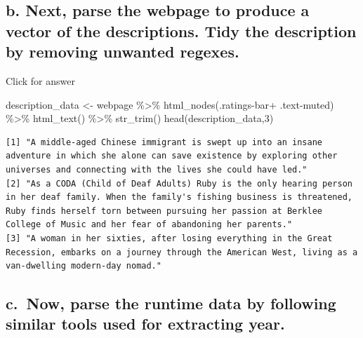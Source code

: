 \documentclass[
]{book}
\newenvironment{Shaded}{\begin{snugshade}}{\end{snugshade}}
\newcommand{\DecValTok}[1]{\textcolor[rgb]{0.00,0.00,0.81}{#1}}
\newcommand{\FunctionTok}[1]{\textcolor[rgb]{0.00,0.00,0.00}{#1}}
\newcommand{\NormalTok}[1]{#1}
\newcommand{\OtherTok}[1]{\textcolor[rgb]{0.56,0.35,0.01}{#1}}
\newcommand{\SpecialCharTok}[1]{\textcolor[rgb]{0.00,0.00,0.00}{#1}}
\newcommand{\StringTok}[1]{\textcolor[rgb]{0.31,0.60,0.02}{#1}}
\begin{document}
\hypertarget{b.-next-parse-the-webpage-to-produce-a-vector-of-the-descriptions.-tidy-the-description-by-removing-unwanted-regexes.}{%
\subsection{b. Next, parse the webpage to produce a vector of the descriptions. Tidy the description by removing unwanted regexes.}\label{b.-next-parse-the-webpage-to-produce-a-vector-of-the-descriptions.-tidy-the-description-by-removing-unwanted-regexes.}}

Click for answer

\begin{Shaded}
\begin{Highlighting}[]
\NormalTok{description\_data }\OtherTok{\textless{}{-}}\NormalTok{ webpage }\SpecialCharTok{\%\textgreater{}\%} 
  \FunctionTok{html\_nodes}\NormalTok{(}\StringTok{\textquotesingle{}.ratings{-}bar+ .text{-}muted\textquotesingle{}}\NormalTok{) }\SpecialCharTok{\%\textgreater{}\%} 
  \FunctionTok{html\_text}\NormalTok{() }\SpecialCharTok{\%\textgreater{}\%} 
  \FunctionTok{str\_trim}\NormalTok{()}
\FunctionTok{head}\NormalTok{(description\_data,}\DecValTok{3}\NormalTok{)}
\end{Highlighting}
\end{Shaded}

\begin{verbatim}
[1] "A middle-aged Chinese immigrant is swept up into an insane adventure in which she alone can save existence by exploring other universes and connecting with the lives she could have led."                                                                      
[2] "As a CODA (Child of Deaf Adults) Ruby is the only hearing person in her deaf family. When the family's fishing business is threatened, Ruby finds herself torn between pursuing her passion at Berklee College of Music and her fear of abandoning her parents."
[3] "A woman in her sixties, after losing everything in the Great Recession, embarks on a journey through the American West, living as a van-dwelling modern-day nomad."                                                                                             
\end{verbatim}

\hypertarget{c.-now-parse-the-runtime-data-by-following-similar-tools-used-for-extracting-year.}{%
\subsection{c.~Now, parse the runtime data by following similar tools used for extracting year.}\label{c.-now-parse-the-runtime-data-by-following-similar-tools-used-for-extracting-year.}}
\end{document}
